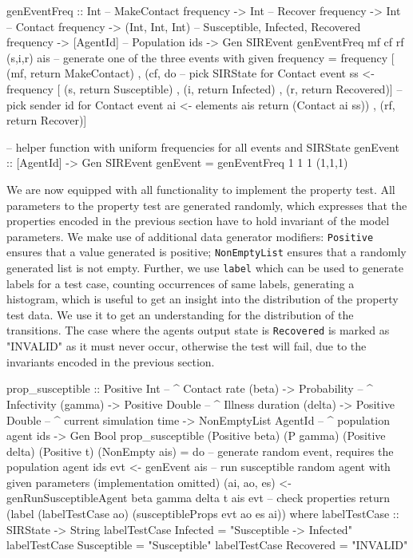 \begin{HaskellCode}
genEventFreq :: Int             -- MakeContact frequency
             -> Int             -- Recover frequency
             -> Int             -- Contact frequency
             -> (Int, Int, Int) -- Susceptible, Infected, Recovered frequency
             -> [AgentId]       -- Population ids
             -> Gen SIREvent
genEventFreq mf cf rf (s,i,r) ais
  -- generate one of the three events with given frequency
  = frequency [ (mf, return MakeContact)
              , (cf, do
                  -- pick SIRState for Contact event
                  ss <- frequency [ (s, return Susceptible)
                                  , (i, return Infected)
                                  , (r, return Recovered)]
                  -- pick sender id for Contact event
                  ai <- elements ais
                  return (Contact ai ss))
              , (rf, return Recover)]
         
-- helper function with uniform frequencies for all events and SIRState
genEvent :: [AgentId] -> Gen SIREvent
genEvent = genEventFreq 1 1 1 (1,1,1) 
\end{HaskellCode}

We are now equipped with all functionality to implement the property test. All parameters to the property test are generated randomly, which expresses that the properties encoded in the previous section have to hold invariant of the model parameters. We make use of additional data generator modifiers: \texttt{Positive} ensures that a value generated is positive; \texttt{NonEmptyList} ensures that a randomly generated list is not empty. Further, we use \texttt{label} which can be used to generate labels for a test case, counting occurrences of same labels, generating a histogram, which is useful to get an insight into the distribution of the property test data. We use it to get an understanding for the distribution of the transitions. The case where the agents output state is \texttt{Recovered} is marked as "INVALID" as it must never occur, otherwise the test will fail, due to the invariants encoded in the previous section.

\begin{HaskellCode}
prop_susceptible :: Positive Int         -- ^ Contact rate (beta)
                 -> Probability          -- ^ Infectivity (gamma)
                 -> Positive Double      -- ^ Illness duration (delta)
                 -> Positive Double      -- ^ current simulation time
                 -> NonEmptyList AgentId -- ^ population agent ids
                 -> Gen Bool
prop_susceptible 
  (Positive beta) (P gamma) (Positive delta) (Positive t) (NonEmpty ais) = do
  -- generate random event, requires the population agent ids
  evt <- genEvent ais
  -- run susceptible random agent with given parameters (implementation omitted)
  (ai, ao, es) <- genRunSusceptibleAgent beta gamma delta t ais evt
  -- check properties
  return (label (labelTestCase ao) (susceptibleProps evt ao es ai))
  where
    labelTestCase :: SIRState -> String
    labelTestCase Infected    = "Susceptible -> Infected"
    labelTestCase Susceptible = "Susceptible"
    labelTestCase Recovered   = "INVALID"
\end{HaskellCode}

